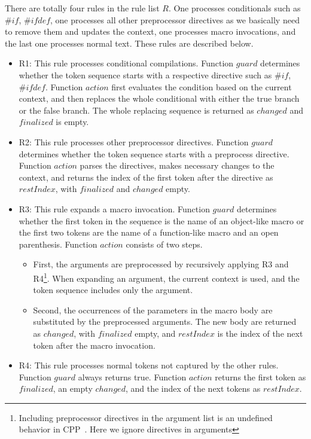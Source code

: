 There are totally four rules in the rule list $R$. One processes
conditionals such as $\#if$, $\#ifdef$, one processes all other
preprocessor directives as we basically need to remove them and
updates the context, one processes macro invocations, and the last one
processes normal text. These rules are described below.
\begin{itemize}
\item R1: This rule processes conditional compilations. Function $guard$ determines whether the token sequence
  starts with a respective directive such as $\#if$,
  $\#ifdef$. Function $action$ first
  evaluates the condition based on the current context, and then replaces the
  whole conditional with either the true branch or the false branch. The whole
  replacing sequence is returned as $changed$ and $finalized$ is empty.
\item R2: This rule processes other preprocessor directives. Function
  $guard$ determines whether the token sequence starts with a
  preprocess directive. Function $action$ parses the directives, makes
  necessary changes to the context, and returns the index of the first token after the
  directive as $restIndex$, with $finalized$ and $changed$ empty.
\item R3: This rule expands a macro invocation. Function $guard$
  determines whether the first token in the sequence is the name of an
  object-like macro or the first two tokens are the name of a
  function-like macro and an open parenthesis. Function $action$
  consists of two steps.
  \begin{itemize}
  \item First, the arguments are preprocessed by recursively applying
    R3 and R4\footnote{Including preprocessor directives in the
      argument list is an undefined behavior in CPP~\cite{CStandard}. Here
      we ignore directives in arguments}.
    When expanding an argument, the current context is used, and the
    token sequence includes only the argument.
  \item Second, the occurrences of the parameters in the macro body are
    substituted by the preprocessed arguments. The new body are returned
    as $changed$, with $finalized$ empty, and $restIndex$ is the index
    of the next token after the macro invocation.
  \end{itemize}
\item R4: This rule processes normal tokens not captured by the other rules. Function $guard$ always
  returns true. Function $action$ returns the first token as
  $finalized$, an empty $changed$, and the index of the next tokens as
  $restIndex$.
\end{itemize}

